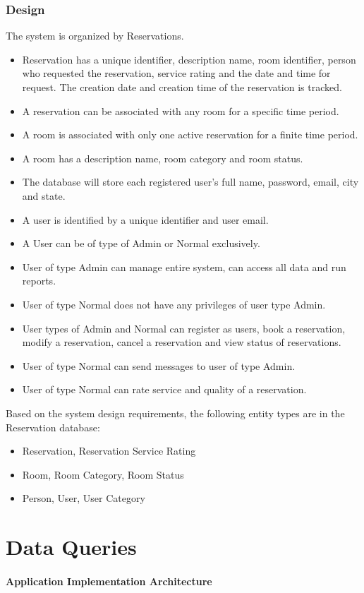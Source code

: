 \documentclass[11pt]{report}
\begin{document}
\subsubsection{Design}
The system is organized by Reservations. 
\begin{itemize}
\item Reservation has a unique identifier, description name, room identifier, person who requested the reservation, service rating and the date and time for request. The creation date and creation time of the reservation is tracked. \item A reservation can be associated with any room for a specific time period.
\item A room is associated with only one active reservation for a finite time period.
\item A room has a description name, room category and room status.
\item The database will store each registered user's full name, password, email, city and state.
\item A user is identified by a unique identifier and user email.
\item A User can be of type of Admin or Normal exclusively.
\item User of type Admin can manage entire system, can access all data and run reports.
\item User of type Normal does not have any privileges of user type Admin.
\item User types of Admin and Normal can register as users, book a reservation, modify a reservation, cancel a reservation and view status of reservations.
\item User of type Normal can send messages to user of type Admin.
\item User of type Normal can rate service and quality of a reservation.
\end{itemize}

Based on the system design requirements, the following entity types are in the Reservation database:
\begin{itemize}
    \item Reservation,  Reservation Service Rating
    \item Room, Room Category, Room Status
    \item Person, User, User Category
\end{itemize}




\section*{Data Queries}
\paragraph{Application Implementation Architecture}
\end{document}
